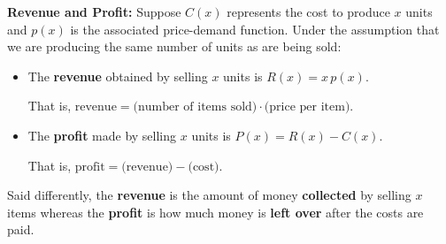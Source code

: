\colorbox{ResultColor}{\bbm

\begin{defn}  \textbf{Revenue and Profit:}  Suppose $C(x)$ represents the cost to produce $x$ units and $p(x)$ is the associated price-demand function.  Under the assumption that we are producing the same number of units as are being sold: \label{revenueprofitdefns}   

\begin{itemize}

\item The  \textbf{revenue} obtained by selling $x$ units is $R(x) = x \, p(x)$.

That is, $\text{revenue} = \text{(number of items sold)} \cdot \text{(price per item)}.$

\item The  \textbf{profit} made by selling $x$ units is $P(x) = R(x) - C(x)$.

That is, $\text{profit} = \text{(revenue)}  - \text{(cost)}.$

\end{itemize}

\end{defn}

\ebm}

\medskip

Said differently, the \textbf{revenue} is the amount of money \textbf{collected} by selling $x$ items whereas the \textbf{profit} is how much money is \textbf{left over} after the costs are paid.
 
